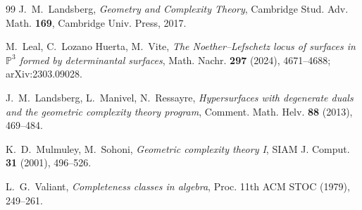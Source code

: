 \documentclass[11pt]{amsart}
\theoremstyle{plain}
\theoremstyle{definition}
\theoremstyle{remark}
\begin{document}
\begin{thebibliography}{99}
 J.~M.~Landsberg, \emph{Geometry and Complexity Theory},
Cambridge Stud. Adv. Math. \textbf{169}, Cambridge Univ. Press, 2017.

 M.~Leal, C.~Lozano Huerta, M.~Vite, \emph{The Noether--Lefschetz
locus of surfaces in $\mathbb{P}^3$ formed by determinantal surfaces}, Math.
Nachr. \textbf{297} (2024), 4671--4688; arXiv:2303.09028.

 J.~M.~Landsberg, L.~Manivel, N.~Ressayre, \emph{Hypersurfaces
with degenerate duals and the geometric complexity theory program}, Comment.
Math. Helv. \textbf{88} (2013), 469--484.

 K.~D.~Mulmuley, M.~Sohoni, \emph{Geometric complexity theory I},
SIAM J. Comput. \textbf{31} (2001), 496--526.

 L.~G.~Valiant, \emph{Completeness classes in algebra}, Proc.
11th ACM STOC (1979), 249--261.

\end{thebibliography}
\end{document}
